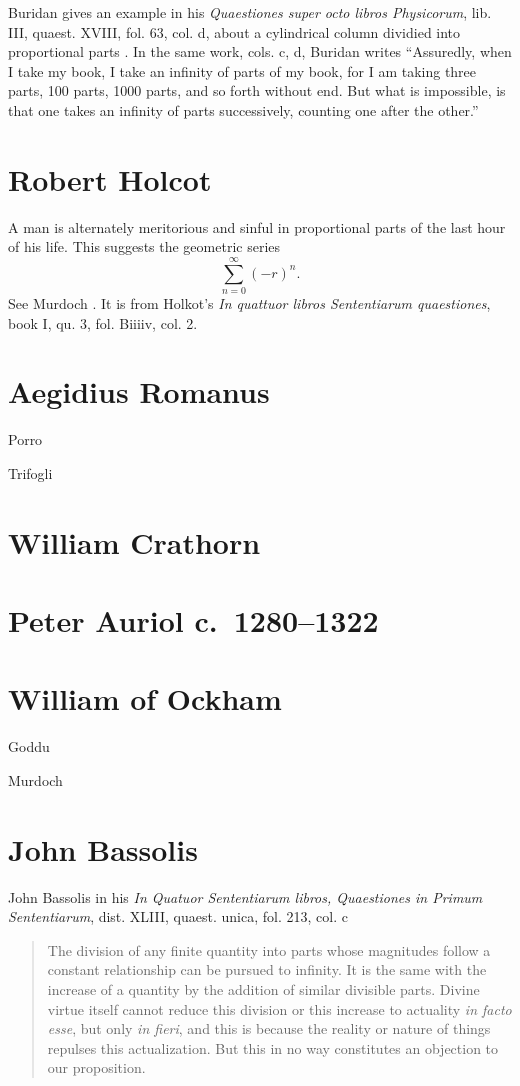 \documentclass{article}
\begin{document}
Buridan gives an example in his {\em Quaestiones super octo libros Physicorum}, lib. III, quaest. XVIII, fol. 63, col. d, about a cylindrical column dividied into proportional parts \cite[p.~58]{ariew}. In the same work, cols. c, d, Buridan writes ``Assuredly, when I take my book, I take an infinity of parts of my book, for I am taking three parts, 100 parts, 1000 parts, and so forth without end.
But what is impossible, is that one takes an infinity of parts successively, counting one after the other.''



\section{Robert Holcot}
A man is alternately meritorious and sinful in proportional parts of the last hour of his life. This suggests the geometric series
\[
\sum_{n=0}^\infty (-r)^n.
\]
See Murdoch \cite[p.~327]{murdoch1975}. It is from Holkot's {\em In quattuor libros
Sententiarum quaestiones}, book I, qu. 3, fol. Biiiiv, col. 2.


\section{Aegidius Romanus}
Porro \cite{porro}

Trifogli \cite{trifogli1993}

\section{William Crathorn}

\section{Peter Auriol c.~1280--1322}


\section{William of Ockham}
Goddu \cite{goddu}

Murdoch \cite{murdoch1982}

\section{John Bassolis}
John Bassolis in his {\em In Quatuor Sententiarum libros, Quaestiones in Primum Sententiarum}, dist. XLIII, quaest. unica, fol. 213, col. c \cite[p.~99]{ariew}
\begin{quote}
The division of any finite quantity into parts whose magnitudes follow a constant relationship can be pursued to infinity. It is the same with the increase of a quantity by the addition
of similar divisible parts. Divine virtue itself cannot reduce this division or this increase to actuality {\em in facto esse}, but only {\em in fieri}, and this is because the reality
or nature of things repulses this actualization. But this in no way constitutes an objection to our proposition.
\end{quote}
\end{document}

